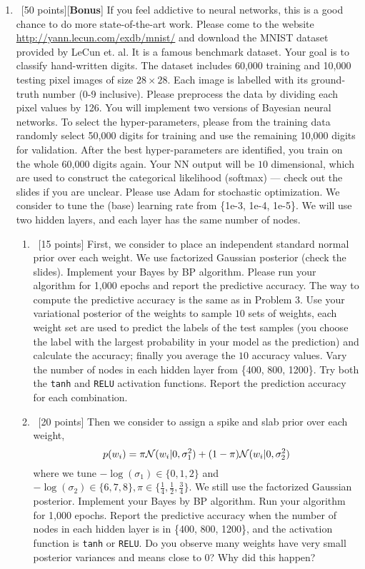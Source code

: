 \documentclass[12pt, fullpage,letterpaper]{article}
\begin{document}
\begin{enumerate}
	\item~[50 points][\textbf{Bonus}] If you feel addictive to neural networks, this is a good chance to do more state-of-the-art work.
	Please come to the website \url{http://yann.lecun.com/exdb/mnist/} and download the MNIST dataset provided by LeCun et. al. It is a famous benchmark dataset. Your goal is to classify hand-written digits. The dataset includes 60,000 training and 10,000 testing pixel images of size $28 \times 28$. Each image is labelled with its ground-truth number (0-9 inclusive). Please preprocess the data by dividing each pixel values by 126. You will implement two versions of Bayesian neural networks. To select the hyper-parameters, please from the training data randomly select 50,000 digits for training and use the remaining 10,000 digits for validation. After the best hyper-parameters are identified, you train on the whole 60,000 digits again. Your NN output will be $10$ dimensional, which are used to construct the categorical likelihood (\ie softmax) --- check out the slides if you are unclear. Please use Adam for stochastic optimization. We consider to tune the (base) learning rate from \{1e-3, 1e-4, 1e-5\}. 
	We will use two hidden layers, and each layer has the same number of nodes. 
	\begin{enumerate}
		\item~[15 points] First, we consider to place an independent standard normal prior over each weight. We use factorized Gaussian posterior (check the slides).  Implement your Bayes by BP algorithm. Please run your algorithm for 1,000 epochs and report the predictive accuracy. The way to compute the predictive accuracy is the same as in Problem 3. Use your variational posterior of the weights to sample $10$ sets of weights, each weight set are used to predict the labels of the test samples (you choose the label with the largest probability in your model as the prediction) and calculate the accuracy; finally you average the $10$ accuracy values. Vary the number of nodes in each hidden layer from \{400, 800, 1200\}. Try both the \texttt{tanh} and \texttt{RELU} activation functions. Report the prediction accuracy for each combination.  
		\item~[20 points] Then we consider to assign a spike and slab prior over each weight,
		\[
		p(w_i) = \pi \mathcal{N}(w_i|0, \sigma_1^2) + (1-\pi)\mathcal{N}(w_i|0, \sigma_2^2)
		\]
		where we tune $-\log(\sigma_1) \in \{0, 1, 2\}$ and $-\log(\sigma_2) \in \{6,7,8\}, \pi \in \{\frac{1}{4}, \frac{1}{2}, \frac{3}{4}\}$. We still use the factorized Gaussian posterior. Implement your Bayes by BP algorithm. Run your algorithm for 1,000 epochs. Report the predictive accuracy when the number of nodes in each hidden layer is in \{400, 800, 1200\}, and the activation function is \texttt{tanh} or \texttt{RELU}. Do you observe many weights have very small posterior variances and means close to $0$? Why did this happen?
		

\end{enumerate}
\end{enumerate}
\end{document}
